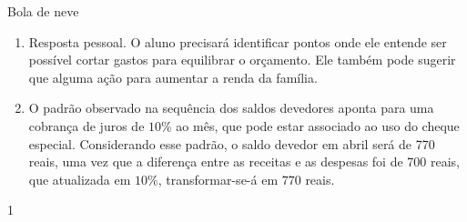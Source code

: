 \begin{answer}{Bola de neve}
{
\begin{enumerate}
\item Resposta pessoal. O aluno precisará identificar pontos onde ele entende ser possível cortar gastos para equilibrar o orçamento. Ele também pode sugerir que alguma ação para aumentar a renda da família.
\item O padrão observado na sequência dos saldos devedores aponta para uma cobrança de juros de $10\%$ ao mês, que pode estar associado ao uso do cheque especial. Considerando esse padrão, o saldo devedor em abril será de 770 reais, uma vez que a diferença entre as receitas e as despesas foi de 700 reais, que atualizada em $10\%$, transformar-se-á em $770$ reais.
\end{enumerate}
}{1}
\end{answer}
